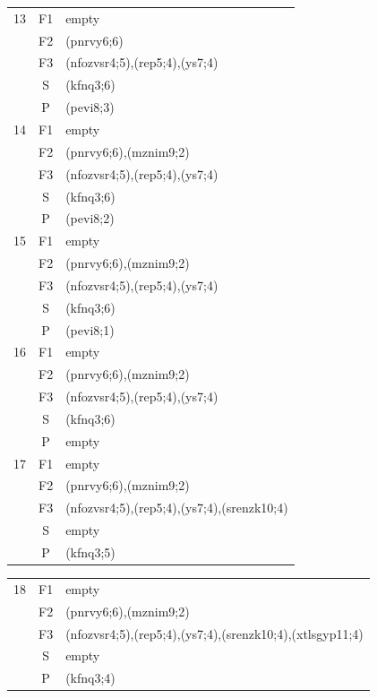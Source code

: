 \documentclass[12pt]{article}
\begin{document}
{\begin{tabular}{|c|c|l|}
		13 & F1 & empty\\ 
		\cline{2-3}
		& F2 & (pnrvy6;6)\\
		\cline{2-3}
		& F3 & (nfozvsr4;5),(rep5;4),(ys7;4)\\
		\cline{2-3}
		& S & (kfnq3;6)\\
		\cline{2-3}
		& P & (pevi8;3)\\
		\hline
		
		14 & F1 & empty\\ 
		\cline{2-3}
		& F2 & (pnrvy6;6),(mznim9;2)\\
		\cline{2-3}
		& F3 & (nfozvsr4;5),(rep5;4),(ys7;4)\\
		\cline{2-3}
		& S & (kfnq3;6)\\
		\cline{2-3}
		& P & (pevi8;2)\\
		\hline
		
		15 & F1 & empty\\ 
		\cline{2-3}
		& F2 & (pnrvy6;6),(mznim9;2)\\
		\cline{2-3}
		& F3 & (nfozvsr4;5),(rep5;4),(ys7;4)\\
		\cline{2-3}
		& S & (kfnq3;6)\\
		\cline{2-3}
		& P & (pevi8;1)\\
		\hline
		
		16 & F1 & empty\\ 
		\cline{2-3}
		& F2 & (pnrvy6;6),(mznim9;2)\\
		\cline{2-3}
		& F3 & (nfozvsr4;5),(rep5;4),(ys7;4)\\
		\cline{2-3}
		& S & (kfnq3;6)\\
		\cline{2-3}
		& P & empty\\
		\hline
		
		17 & F1 & empty\\ 
		\cline{2-3}
		& F2 & (pnrvy6;6),(mznim9;2)\\
		\cline{2-3}
		& F3 & (nfozvsr4;5),(rep5;4),(ys7;4),(srenzk10;4)\\
		\cline{2-3}
		& S & empty\\
		\cline{2-3}
		& P & (kfnq3;5)\\
		\hline
	\end{tabular}
	
	\begin{tabular}{|c|c|l|}
		\hline		
		18 & F1 & empty\\ 
		\cline{2-3}
		& F2 & (pnrvy6;6),(mznim9;2)\\
		\cline{2-3}
		& F3 & (nfozvsr4;5),(rep5;4),(ys7;4),(srenzk10;4),(xtlsgyp11;4)\\
		\cline{2-3}
		& S & empty\\
		\cline{2-3}
		& P & (kfnq3;4)\\
		\hline
	

\end{tabular}}
\end{document}
